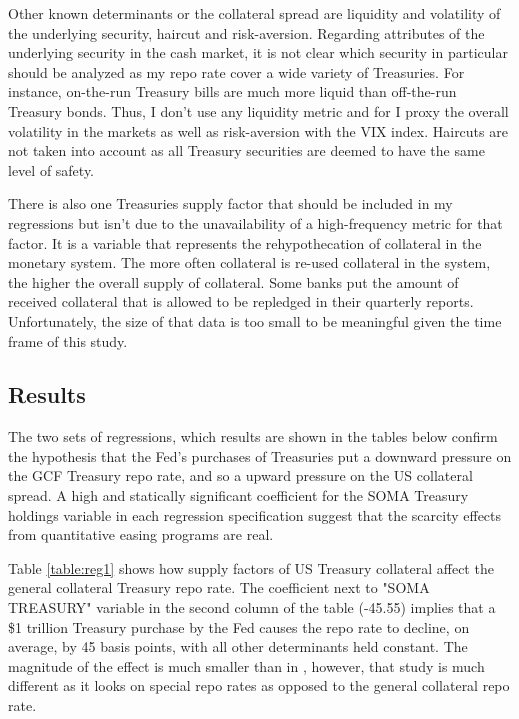 \documentclass[11pt,a4paper,english,oneside]{article}
\begin{document}
Other known determinants or the collateral spread are liquidity and volatility of the underlying security, haircut and risk-aversion. Regarding attributes of the underlying security in the cash market, it is not clear which security in particular should be analyzed as my repo rate cover a wide variety of Treasuries. For instance, on-the-run Treasury bills are much more liquid than off-the-run Treasury bonds. Thus, I don't use any liquidity metric and for I proxy the overall volatility in the markets as well as risk-aversion with the VIX index. Haircuts are not taken into account as all Treasury securities are deemed to have the same level of safety.

There is also one Treasuries supply factor that should be included in my regressions but isn't due to the unavailability of a high-frequency metric for that factor. It is a variable that represents the rehypothecation of collateral in the monetary system. The more often collateral is re-used collateral in the system, the higher the overall supply of collateral. Some banks put the amount of received  collateral that is allowed to be repledged in their quarterly reports. Unfortunately, the size of that data is too small to be meaningful given the time frame of this study.

\subsection{Results} \label{sec:results}

The two sets of regressions, which results are shown in the tables below confirm the hypothesis that the Fed's purchases of Treasuries put a downward pressure on the GCF Treasury repo rate, and so a upward pressure on the US collateral spread. A high and statically significant coefficient for the SOMA Treasury holdings variable in each regression specification suggest that the scarcity effects from quantitative easing programs are real.

Table \ref{table:reg1} shows how supply factors of US Treasury collateral affect the general collateral Treasury repo rate. The coefficient next to "SOMA TREASURY" variable in the second column of the table (-45.55) implies that a \$1 trillion Treasury purchase by the Fed causes the repo rate to decline, on average, by 45 basis points, with all other determinants held constant. The magnitude of the effect is much smaller than in \citet{damico2014}, however, that study is much different as it looks on special repo rates as opposed to the general collateral repo rate.
\end{document}
